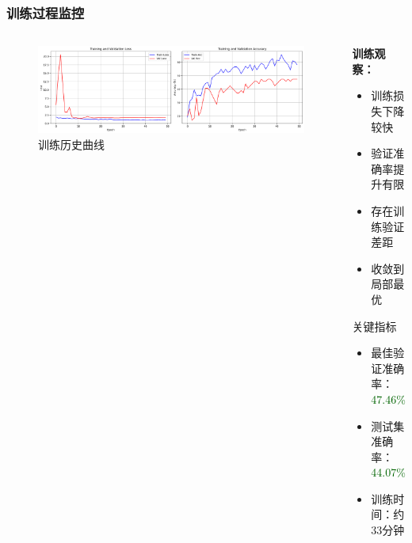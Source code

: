 \documentclass[10pt]{beamer}
\begin{document}
\begin{frame}
\frametitle{训练过程监控}
\begin{columns}
\begin{column}{0.5\textwidth}
\begin{figure}
\centering
\includegraphics[width=\textwidth]{training_history.png}
\caption{训练历史曲线}
\end{figure}
\end{column}

\begin{column}{0.5\textwidth}
\textbf{训练观察：}
\begin{itemize}
    \item 训练损失下降较快
    \item 验证准确率提升有限
    \item 存在训练验证差距
    \item 收敛到局部最优
\end{itemize}

\vspace{0.3cm}
\begin{block}{关键指标}
\begin{itemize}
    \item 最佳验证准确率：\textcolor{darkgreen}{47.46\%}
    \item 测试集准确率：\textcolor{darkgreen}{44.07\%}
    \item 训练时间：约33分钟
\end{itemize}
\end{block}
\end{column}
\end{columns}
\end{frame}
\end{document}
